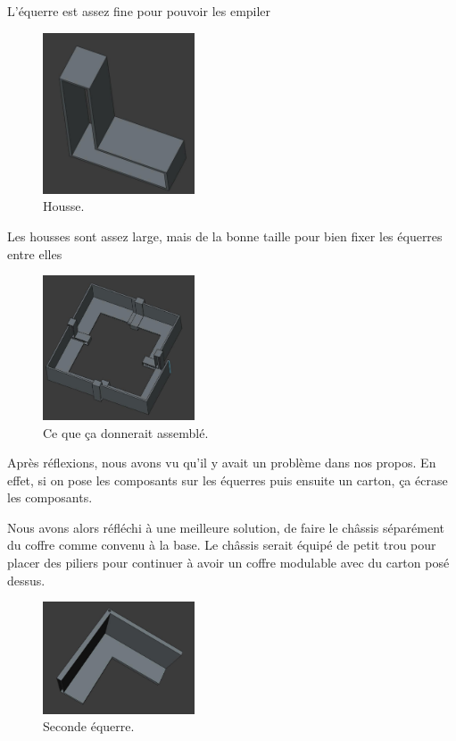 \documentclass[a4paper,12pt]{report}  %
\begin{document}
L'équerre est assez fine pour pouvoir les empiler

\begin{figure}[H]
	\centering
	\includegraphics[width=0.4\textwidth]{./attachments/cad_housse.jpg}
	\caption{Housse.}
\end{figure}

Les housses sont assez large, mais de la bonne taille pour bien fixer les équerres entre elles

\begin{figure}[H]
	\centering
	\includegraphics[width=0.4\textwidth]{./attachments/cad_assemblage.jpg}
	\caption{Ce que ça donnerait assemblé.}
\end{figure}

Après réflexions, nous avons vu qu’il y avait un problème dans nos propos. En effet, si on pose les composants sur les équerres puis ensuite un carton, ça écrase les composants.

Nous avons alors réfléchi à une meilleure solution, de faire le châssis séparément du coffre comme convenu à la base. Le châssis serait équipé de petit trou pour placer des piliers pour continuer à avoir un coffre modulable avec du carton posé dessus. 

\begin{figure}[H]
	\centering
	\includegraphics[width=0.4\textwidth]{./attachments/cad_equerre_v2.jpg}
	\caption{Seconde équerre.}
\end{figure}
\end{document}
